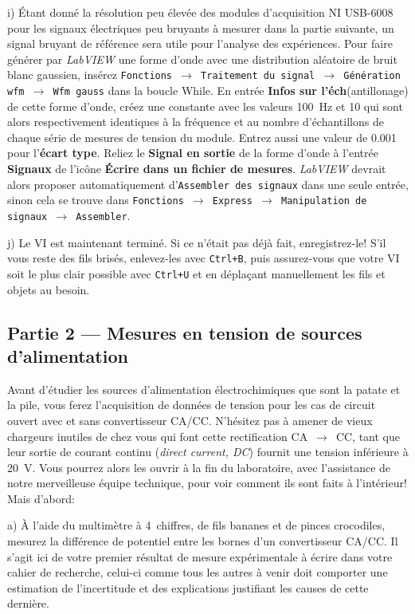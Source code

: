 \documentclass[canadien,12pt,oneside,letterpaper]{article}
\begin{document}
i) Étant donné la résolution peu élevée des modules d'acquisition NI USB-6008 pour les signaux électriques peu bruyants à mesurer dans la partie suivante, un signal bruyant de référence sera utile pour l'analyse des expériences. Pour faire générer par \textit{LabVIEW} une forme d'onde avec une distribution aléatoire de bruit blanc gaussien, insérez \texttt{Fonctions $\rightarrow$ Traitement du signal $\rightarrow$ Génération wfm $\rightarrow$ Wfm gauss} dans la boucle While. En entrée \textbf{Infos sur l'éch}(antillonage) de cette forme d'onde, créez une constante avec les valeurs 100~Hz et 10 qui sont alors respectivement identiques à la fréquence et au nombre d'échantillons de chaque série de mesures de tension du module. Entrez aussi une valeur de 0.001 pour l'\textbf{écart type}. Reliez le \textbf{Signal en sortie} de la forme d'onde à l'entrée \textbf{Signaux} de l'icône \textbf{Écrire dans un fichier de mesures}. \textit{LabVIEW} devrait alors proposer automatiquement d'\texttt{Assembler des signaux} dans une seule entrée, sinon cela se trouve dans \texttt{Fonctions $\rightarrow$ Express $\rightarrow$ Manipulation de signaux $\rightarrow$ Assembler}.

j) Le VI est maintenant terminé. Si ce n'était pas déjà fait, enregistrez-le! S'il vous reste des fils brisés, enlevez-les avec \texttt{Ctrl+B}, puis assurez-vous que votre VI soit le plus clair possible avec \texttt{Ctrl+U} et en déplaçant manuellement les fils et objets au besoin.


\subsection{Partie 2 --- Mesures en tension de sources d'alimentation}

Avant d'étudier les sources d'alimentation électrochimiques que sont la patate et la pile, vous ferez l'acquisition de données de tension pour les cas de circuit ouvert avec et sans convertisseur CA/CC. N'hésitez pas à amener de vieux chargeurs inutiles de chez vous qui font cette rectification CA~$\rightarrow$~CC, tant que leur sortie de courant continu (\textit{direct current, DC}) fournit une tension inférieure à 20~V. Vous pourrez alors les ouvrir à la fin du laboratoire, avec l'assistance de notre merveilleuse équipe technique, pour voir comment ils sont faits à l'intérieur! Mais d'abord:

a) À l'aide du multimètre à 4\textonehalf~chiffres, de fils bananes et de pinces crocodiles, mesurez la différence de potentiel entre les bornes d'un convertisseur CA/CC. Il s'agit ici de votre premier résultat de mesure expérimentale à écrire dans votre cahier de recherche, celui-ci comme tous les autres à venir doit comporter une estimation de l'incertitude et des explications justifiant les causes de cette dernière.
\end{document}
